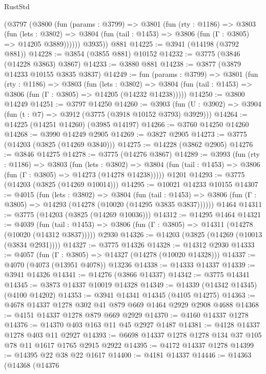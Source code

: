 \begin{lexlean}{RustStd}
\begin{coremodule}
{\begin{coremodule}
{{{{{{{{{{{{{{{{{{{{{{{{{{{{{{{      (@3797
        (@3800
          (fun (params : @3799) =>
          @3801
            (fun (rty : @1186) =>
            @3803
              (fun (lets : @3802) =>
              @3804 (fun (tail : @1453) => @3806 (fun (Γ : @3805) => @14205 @3889))))))
        @3935))
    @881
@14225 := @3941 (@14198 (@3792 @881))
@14228 := @3854 (@3855 @881) @10152
@14232 := @3775 (@3846 (@14228 @3863) @3867)
@14233 := @3880 @881
@14238 := @3877 (@3879 @14233 @10155 @3835 @3837)
@14249 := fun (params : @3799) =>
  @3801
    (fun (rty : @1186) =>
    @3803
      (fun (lets : @3802) =>
      @3804 (fun (tail : @1453) => @3806 (fun (Γ : @3805) => @14205 (@14232 @14238)))))
@14250 := @3800 @14249
@14251 := @3797 @14250
@14260 := @3903
    (fun (U : @3902) => @3904 (fun (t : @7) => @3912 (@3775 (@3918 @10152 @3793) @3929)))
@14264 := @14225 (@14251 @14260) (@3985 @14197)
@14266 := @3760 @14250 @14260
@14268 := @3990 @14249 @2905
@14269 := @3827 @2905
@14273 := @3775 (@14203 (@3825 (@14269 @3840)))
@14275 := @14228 (@3862 @2905)
@14276 := @3846 @14275
@14278 := @3775 (@14276 @3867)
@14289 := @3993
    (fun (rty : @1186) =>
    @3803
      (fun (lets : @3802) =>
      @3804 (fun (tail : @1453) => @3806 (fun (Γ : @3805) => @14273 (@14278 @14238)))))
    @1201
@14293 := @3775 (@14203 (@3825 (@14269 @10014)))
@14295 := @10021 @14233 @10155
@14307 := @4015
    (fun (lets : @3802) =>
    @3804
      (fun (tail : @1453) =>
      @3806 (fun (Γ : @3805) => @14293 (@14278 (@10020 (@14295 @3835 @3837))))))
    @1464
@14311 := @3775 (@14203 (@3825 (@14269 @10036)))
@14312 := @14295 @1464
@14321 := @4039
    (fun (tail : @1453) => @3806 (fun (Γ : @3805) => @14311 (@14278 (@10020 (@14312 @3837)))))
    @2930
@14326 := @14203 (@3825 (@14269 (@10013 (@3834 @2931))))
@14327 := @3775 @14326
@14328 := @14312 @2930
@14333 := @4057 (fun (Γ : @3805) => @14327 (@14278 (@10020 @14328)))
@14337 := @4070 (@4073 (@13951 @4078)) @13236
@14338 := @14333 @14337
@14339 := @3941 @14326
@14341 := @14276 (@3866 @14337)
@14342 := @3775 @14341
@14345 := @3873 @14337 @10019 @14328
@14349 := @14339 (@14342 @14345) (@4100 @14202)
@14353 := @3941 @14341 @14345 (@4105 @14275)
@14363 := @4678 @14337 @1278 @302 @41 @879 @669 @1464 @2929 @2908 @4688
@14368 := @4151 @14337 @1278 @879 @669 @2929
@14370 := @4160 @14337 @1278
@14376 := @14370 @403 @163 @11 @45 @2927 @1487
@14381 := @4128 @14337 @1278 @403 @11 @2927
@14393 := @6698 @14337 @1278 @1278 @134 @37 @105 @78 @11 @1617 @1765 @2915 @2922
@14395 := @4172 @14337 @1278
@14399 := @14395 @22 @38 @22 @1617
@14400 := @4181 @14337
@14446 := @14363
    (@14368
      (@14376
}}}}}}}}}}}}}}}}}}}}}}}}}}}}}}}
\end{coremodule}}
\end{coremodule}
\end{lexlean}

